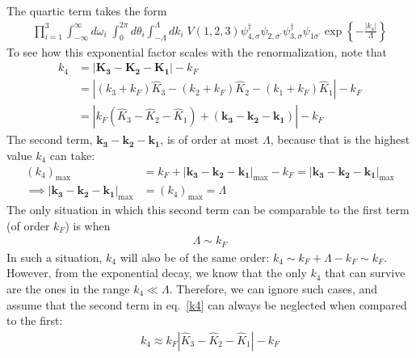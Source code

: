 \documentclass[14pt]{extarticle}
\begin{document}
The quartic term takes the form
\begin{equation}\begin{aligned}
	\prod_{i=1}^3\int_{-\infty}^\infty d\omega_i\;\int_0^{2\pi} d\theta_i \int_{-\Lambda}^{\Lambda}dk_i \;V(1,2,3)\psi_{4,\sigma}^\dagger\psi_{2,\sigma^\prime}\psi_{3,\sigma}^\dagger\psi_{1\sigma^\prime}\exp\left\{-\frac{|k_4|}{\Lambda}\right\}
\end{aligned}\end{equation}
To see how this exponential factor scales with the renormalization, note that
\begin{equation}\begin{aligned}
\label{k4}
k_4 &= \left|\mathbf{K_3} - \mathbf{K_2} - \mathbf{K_1}\right| - k_F \\
    &= \left|\left(k_3 + k_F\right)\hat K_3 - \left(k_2 + k_F\right)\hat K_2 - \left(k_1 + k_F\right)\hat K_1\right| - k_F\\
    &=\left|k_F\left(\hat K_3 - \hat K_2 - \hat K_1\right) + \left(\mathbf{k_3} - \mathbf{k_2} - \mathbf{k_1}\right)\right| - k_F
\end{aligned}\end{equation}
The second term, \(\mathbf{k_3} - \mathbf{k_2} - \mathbf{k_1}\), is of order at most \(\Lambda\), because that is the highest value \(k_4\) can take:
\begin{equation}\begin{aligned}
	(k_4)_\mathrm{max} &= k_F + |\mathbf{k_3} - \mathbf{k_2} - \mathbf{k_1}|_\mathrm{max} - k_F = |\mathbf{k_3} - \mathbf{k_2} - \mathbf{k_1}|_\mathrm{max}\\
	\implies |\mathbf{k_3} - \mathbf{k_2} - \mathbf{k_1}|_\mathrm{max} &= (k_4)_\mathrm{max} = \Lambda
\end{aligned}\end{equation}
The only situation in which this second term can be comparable to the first term (of order \(k_F\)) is when
\begin{equation}\begin{aligned}
\Lambda \sim k_F
\end{aligned}\end{equation}
In such a situation, \(k_4\) will also be of the same order: \(k_4 \sim k_F + \Lambda - k_F \sim k_F\). However, from the exponential decay, we know that the only \(k_4\) that can survive are the ones in the range \(k_4 \ll \Lambda\). Therefore, we can ignore such cases, and assume that the second term in eq.~\ref{k4} can always be neglected when compared to the first:
\begin{equation}\begin{aligned}
	k_4 \approx k_F\left|\hat K_3 - \hat K_2 - \hat K_1\right| - k_F
\end{aligned}\end{equation}
\end{document}

